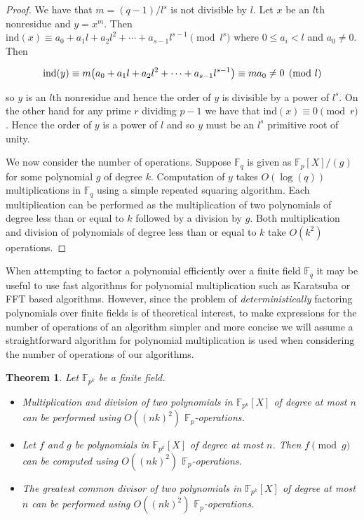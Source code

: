 \documentclass{article}
\let\originalleft\left
\let\originalright\right
\renewcommand{\left}{\mathopen{}\mathclose\bgroup\originalleft}
\renewcommand{\right}{\aftergroup\egroup\originalright}
\newcounter{dummy} \numberwithin{dummy}{section}
\theoremstyle{plain}
\newtheorem{thm}[dummy]{Theorem}
\theoremstyle{definition}
\def\Fp {{ \mathbb{F} _ {p} }}
\def\Fq {{ \mathbb{F} _ {q} }}
\def\FpE {{ \mathbb{F} _ {p^k} }}
\def\ind {{ \mathrm{ind} }}
\begin{document}
		\begin{proof}
		    We have that $m=(q-1)/l^s$ is not divisible by $l$. Let $x$ be an $l$th nonresidue and $y=x^m$. Then $\ind(x) \equiv a_0+a_1l+a_2l^2+ \cdots +a_{s-1}l^{s-1} \pmod{l^s}$ where $0 \leq a_i < l$ and $a_0 \not=0$. Then
				
				\[ \ind(y) \equiv m \left(a_0+{a_1}l+{a_2}l^2+\cdots+a_{s-1}l^{s-1} \right)
				\equiv ma_0 \not=0 \pmod{l} \]
				
				\noindent so $y$ is an $l$th nonresidue and hence the order of $y$ is divisible by a power of $l^s$. On the other hand for any prime $r$ dividing $p-1$ we have that $\ind(x) \equiv 0 \pmod{r}$. Hence the order of $y$ is a power of $l$ and so $y$ must be an $l^s$ primitive root of unity.
				
				We now consider the number of operations. Suppose $\Fq$ is given as $\Fp[X]/(g)$ for some polynomial $g$ of degree $k$. Computation of $y$ takes $O(\log(q))$ multiplications in $\Fq$ using a simple repeated squaring algorithm. Each multiplication can be performed as the multiplication of two polynomials of degree less than or equal to $k$ followed by a division by $g$. Both multiplication and division of polynomials of degree less than or equal to $k$ take $O(k^2)$ operations. 
		\end{proof}
		
	  When attempting to factor a polynomial efficiently over a finite field $\Fq$ it may be useful to use fast algorithms for polynomial multiplication such as Karatsuba or FFT based algorithms. However, since the problem of \emph{deterministically} factoring polynomials over finite fields is of theoretical interest, to make expressions for the number of operations of an algorithm simpler and more concise we will assume a straightforward algorithm for polynomial multiplication is used when considering the number of operations of our algorithms.
				
		\begin{thm}
		\label{THM:EASYTIMES}
		    Let $\FpE$ be a finite field. 
				\begin{itemize}
				    \item Multiplication and division of two polynomials in $\FpE[X]$ of degree at most $n$ can be performed using $O((nk)^2)$ $\Fp$-operations. 
				    \item Let $f$ and $g$ be polynomials in $\FpE[X]$ of degree at most $n$. Then $f \pmod g$ can be computed using $O((nk)^2)$ $\Fp$-operations.
				    \item The greatest common divisor of two polynomials in $\FpE[X]$ of degree at most $n$ can be performed using $O((nk)^2)$ $\Fp$-operations. 
				\end{itemize}
		\end{thm}
		
\end{document}
